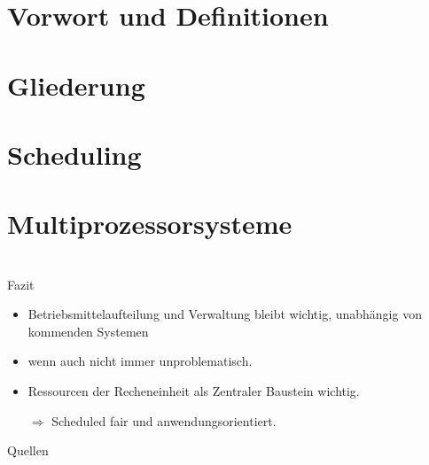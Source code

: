 \section{Vorwort und Definitionen}


\section{Gliederung}


\section{Scheduling}


\section{Multiprozessorsysteme}



\section{}
\begin{frame}{Fazit}
	\begin{itemize}
		\item Betriebsmittelaufteilung und Verwaltung bleibt wichtig, unabhängig von kommenden Systemen
		\item wenn auch nicht immer unproblematisch.
		\item Ressourcen der Recheneinheit als Zentraler Baustein wichtig.
		\item[\(\Rightarrow\)] Scheduled fair und anwendungsorientiert.
	\end{itemize}
\end{frame}

\begin{frame}[allowframebreaks]{Quellen}
	
	
\end{frame}